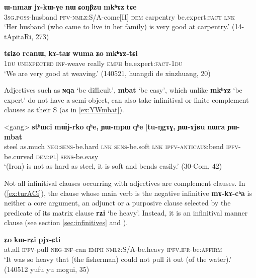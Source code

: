 \documentclass[oldfontcommands,oneside,a4paper,11pt]{article}
\newcommand{\ipa}[1]{\textbf{\phon#1}} %
\newcommand{\jpg}[2]{\ipa{#1} `#2'} %
\begin{document}
\begin{exe}
\ex \label{ex:CoNBzu.mkhAz}
\gll 
\ipa{ɯ-nmaʁ} 	\ipa{jɤ-kɯ-ɣe} 	\ipa{nɯ} 	\ipa{ɕoŋβzu} 	\ipa{mkʰɤz} 	\ipa{tɕe} \\
\textsc{3sg.poss}-husband \textsc{pfv-nmlz}:S/A-come[II] \textsc{dem} carpentry be.expert:\textsc{fact} \textsc{lnk} \\
\glt `Her husband (who came to live in her family) is very good at carpentry.' (14-tApitaRi, 273)
\end{exe}

\begin{exe}
\ex \label{ex:mkhAztCi}
\gll \ipa{tɕiʑo} 	\ipa{rcanɯ,} 	\ipa{kɤ-taʁ} 	\ipa{wuma} 	\ipa{ʑo} 	\ipa{mkʰɤz-tɕi} 	 \\
\textsc{1du}  \textsc{unexpected} \textsc{inf}-weave really \textsc{emph} be.expert:\textsc{fact}-\textsc{1du} \\
\glt `We are very good at weaving.' (140521, huangdi de xinzhuang, 20)
\end{exe}

Adjectives such as \jpg{ɴqa}{be difficult}, \jpg{mbat}{be easy}, which unlike \jpg{mkʰɤz}{be expert} do not have a semi-object, can also take infinitival or finite complement clauses as their S (as in \ref{ex:YWmbat}).

\begin{exe}
\ex \label{ex:YWmbat}
\gll
<gang> 	\ipa{stʰɯci} 	\ipa{mɯ́j-rko} 	\ipa{qʰe,} 	\ipa{ɲɯ-mpɯ} 	\ipa{qʰe} 	[\ipa{tu-ŋgɤɣ,} 	\ipa{ɲɯ-ɤjʁu} 	\ipa{nɯra} 	\ipa{ɲɯ-mbat} \\
steel as.much \textsc{neg:sens}-be.hard \textsc{lnk} \textsc{sens}-be.soft \textsc{lnk} \textsc{ipfv-anticaus}:bend \textsc{ipfv}-be.curved  \textsc{dem:pl}] \textsc{sens}-be.easy \\
\glt `(Iron) is not as hard as steel, it is soft and bends easily.' (30-Com, 42)
\end{exe}


Not all infinitival clauses occurring with adjectives are complement clauses. In (\ref{ex:turACi}), the clause whose main verb is the negative infinitive \ipa{mɤ-kɤ-cʰa} is neither a core argument, an adjunct or a purposive clause selected by the predicate of its matrix clause \jpg{rʑi}{be heavy}. Instead, it is an infinitival manner clause (see section \ref{sec:infinitives} and \citealt{jacques14linking}).

\begin{exe}
\ex \label{ex:turACi}
\gll [\ipa{maka} 	\ipa{tu-rɤɕi} 	\ipa{mɤ-kɤ-cʰa}] 	\ipa{ʑo} 	\ipa{kɯ-rʑi} 	\ipa{pjɤ-ɕti} \\
at.all \textsc{ipfv}-pull \textsc{neg-inf}-can \textsc{emph} \textsc{nmlz}:S/A-be.heavy \textsc{ipfv.ifr}-be:\textsc{affirm} \\
\glt `It was so heavy that (the fisherman) could not pull it out (of the water).' (140512 yufu yu mogui, 35)
\end{exe}
\end{document}
